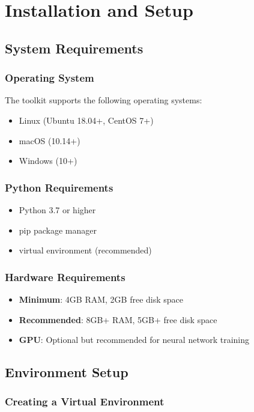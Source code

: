 \chapter{Installation and Setup}

\section{System Requirements}

\subsection{Operating System}
The toolkit supports the following operating systems:
\begin{itemize}
    \item Linux (Ubuntu 18.04+, CentOS 7+)
    \item macOS (10.14+)
    \item Windows (10+)
\end{itemize}

\subsection{Python Requirements}
\begin{itemize}
    \item Python 3.7 or higher
    \item pip package manager
    \item virtual environment (recommended)
\end{itemize}

\subsection{Hardware Requirements}
\begin{itemize}
    \item \textbf{Minimum}: 4GB RAM, 2GB free disk space
    \item \textbf{Recommended}: 8GB+ RAM, 5GB+ free disk space
    \item \textbf{GPU}: Optional but recommended for neural network training
\end{itemize}

\section{Environment Setup}

\subsection{Creating a Virtual Environment}

